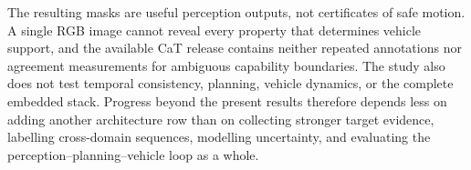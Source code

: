 The resulting masks are useful perception outputs, not certificates of safe
motion. A single RGB image cannot reveal every property that determines vehicle
support, and the available CaT release contains neither repeated annotations
nor agreement measurements for ambiguous capability boundaries. The study also
does not test temporal consistency, planning, vehicle dynamics, or the complete
embedded stack. Progress beyond the present results therefore depends less on
adding another architecture row than on collecting stronger target evidence,
labelling cross-domain sequences, modelling uncertainty, and evaluating the
perception--planning--vehicle loop as a whole.
